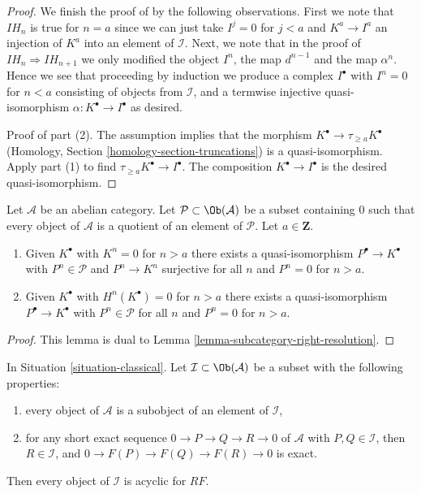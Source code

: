 \begin{proof}
\medskip\noindent
We finish the proof of by the following observations.
First we note that $IH_n$ is true for $n = a$ since
we can just take $I^j = 0$ for $j < a$ and $K^a \to I^a$ an injection
of $K^a$ into an element of $\mathcal{I}$.
Next, we note that in the proof of $IH_n \Rightarrow IH_{n + 1}$
we only modified the object $I^n$, the map $d^{n - 1}$ and
the map $\alpha^n$. Hence we see that proceeding by induction
we produce a complex $I^\bullet$ with $I^n = 0$ for $n < a$
consisting of objects from $\mathcal{I}$, and a termwise
injective quasi-isomorphism $\alpha : K^\bullet \to I^\bullet$ as desired.

\medskip\noindent
Proof of part (2). The assumption implies that the morphism
$K^\bullet \to \tau_{\geq a}K^\bullet$
(Homology, Section \ref{homology-section-truncations})
is a quasi-isomorphism.
Apply part (1) to find $\tau_{\geq a}K^\bullet \to I^\bullet$.
The composition $K^\bullet \to I^\bullet$ is the desired quasi-isomorphism.
\end{proof}

\begin{lemma}
\label{lemma-subcategory-left-resolution}
Let $\mathcal{A}$ be an abelian category. Let
$\mathcal{P} \subset \Ob(\mathcal{A})$ be a subset containing $0$
such that every object of $\mathcal{A}$ is a quotient of an element of
$\mathcal{P}$. Let $a \in \mathbf{Z}$.
\begin{enumerate}
\item Given $K^\bullet$ with $K^n = 0$ for $n > a$
there exists a quasi-isomorphism $P^\bullet \to K^\bullet$
with $P^n \in \mathcal{P}$ and $P^n \to K^n$ surjective
for all $n$ and $P^n = 0$ for $n > a$.
\item Given $K^\bullet$ with $H^n(K^\bullet) = 0$ for $n > a$
there exists a quasi-isomorphism $P^\bullet \to K^\bullet$
with $P^n \in \mathcal{P}$ for all $n$ and $P^n = 0$ for $n > a$.
\end{enumerate}
\end{lemma}

\begin{proof}
This lemma is dual to
Lemma \ref{lemma-subcategory-right-resolution}.
\end{proof}

\begin{lemma}
\label{lemma-subcategory-right-acyclics}
In
Situation \ref{situation-classical}.
Let $\mathcal{I} \subset \Ob(\mathcal{A})$ be a subset with the
following properties:
\begin{enumerate}
\item every object of $\mathcal{A}$ is a subobject of an element of
$\mathcal{I}$,
\item for any short exact sequence $0 \to P \to Q \to R \to 0$ of
$\mathcal{A}$ with $P, Q \in \mathcal{I}$, then $R \in \mathcal{I}$,
and $0 \to F(P) \to F(Q) \to F(R) \to 0$ is exact.
\end{enumerate}
Then every object of $\mathcal{I}$ is acyclic for $RF$.
\end{lemma}

